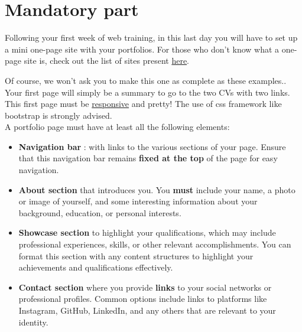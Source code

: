 \documentclass[12pt, a4paper]{report}
\begin{document}
\chapter{Mandatory part}

	Following your first week of web training, in this last day you will have to set up a mini
	one-page site with your portfolios. For those who don't know what a one-page site is, check
	out the list of sites present \href{https://bootstrapmade.com/bootstrap-resume-cv-templates/}{here}.

	\vspace{.2cm}Of course, we won't ask you to make this one as complete as these examples..\\

	\vspace{.2cm}Your first page will simply be a summary to go to the two CVs with two links.\\

	\vspace{.2cm}This first page must be \href{https://www.w3schools.com/html/html_responsive.asp}{responsive} and pretty! The use of css framework like bootstrap is strongly advised.\\

	A portfolio page must have at least all the following elements:

	\begin{itemize}

		\item \textbf{Navigation bar} : with links to the various sections of your page. Ensure that this navigation bar remains \textbf{fixed at the top} of the page for easy navigation.

		\item  \textbf{About section} that introduces you. You \textbf{must} include your name, a photo or image of yourself, and some interesting information about your background, education, or personal interests.

		\item  \textbf{Showcase section} to highlight your qualifications, which may include professional experiences, skills, or other relevant accomplishments. You can format this section with any content structures to highlight your achievements and qualifications effectively.

		\item  \textbf{Contact section} where you provide \textbf{links} to your social networks or professional profiles. Common options include links to platforms like Instagram, GitHub, LinkedIn, and any others that are relevant to your identity.

	\end{itemize}
\end{document}
